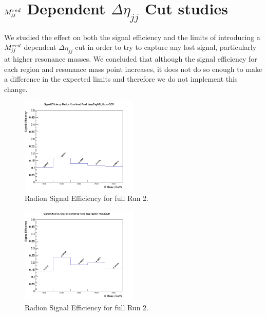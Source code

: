\section{$M_{\textrm jj}^{red}$ Dependent $\Delta \eta_{jj}$ Cut studies\label{s:mredDeltaEta}}
We studied the effect on both the signal efficiency and the limits of introducing a $M_{\textrm jj}^{red}$ dependent $\Delta \eta_{jj}$ cut in order to try to capture any lost signal, particularly at higher resonance masses.
We concluded that although the signal efficiency for each region and resonance mass point increases, it does not do so enough to make a difference in the expected limits and therefore we do not implement this change.
\begin{figure}[!htb]
	\centering
	\includegraphics[width=0.5\textwidth]{Figures/sigEffrad_combined_Run2_deepTagMD_HbbvsQCD_base.png}
	\caption{Radion Signal Efficiency for full Run 2.}
	\label{fig:sigEffRad}
\end{figure}
\begin{figure}[!htb]
	\centering
	\includegraphics[width=0.5\textwidth]{Figures/sigEffgrav_combined_Run2_deepTagMD_HbbvsQCD_base.png}
	\caption{Radion Signal Efficiency for full Run 2.}
	\label{fig:sigEffGrav}
\end{figure}

